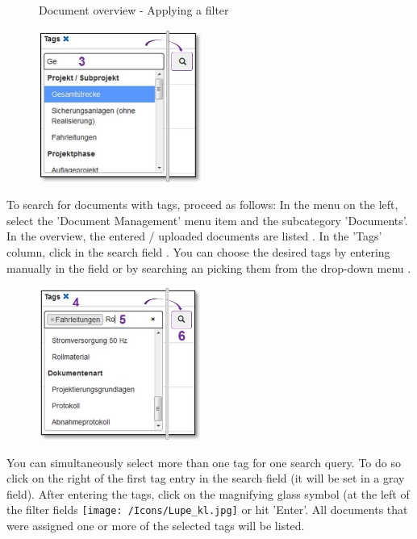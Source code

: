 \begin{figure}[H]
\caption{Document overview - Applying a filter}
\end{figure}

\begin{figure}
\vspace{-10pt}
\includegraphics[height=50mm]{../chapters/11_Dokumentenablage/pictures/11-2-8_DokTagHinzufuegen.jpg}
\end{figure}
To search for documents with tags, proceed as follows:
In the menu on the left, select the 'Document Management' menu item and the subcategory 'Documents'. In the overview, the entered / uploaded documents are listed . In the 'Tags' column, click in the search field . You can choose the desired tags by entering manually in the field or by searching an picking them from the drop-down menu .

\vspace{\baselineskip}

\begin{figure}
\vspace{-30pt}
\includegraphics[height=50mm]{../chapters/11_Dokumentenablage/pictures/11-2-8_TagEingabe.jpg}
\end{figure}
You can simultaneously select more than one tag for one search query. To do so click on the right of the first tag entry  in the search field  (it will be set in a gray field). After entering the tags, click on the magnifying glass symbol (at the left of the filter fields \texttt{[image: /Icons/Lupe\_kl.jpg]}  or hit 'Enter'. All documents that were assigned one or more of the selected tags will be listed.

